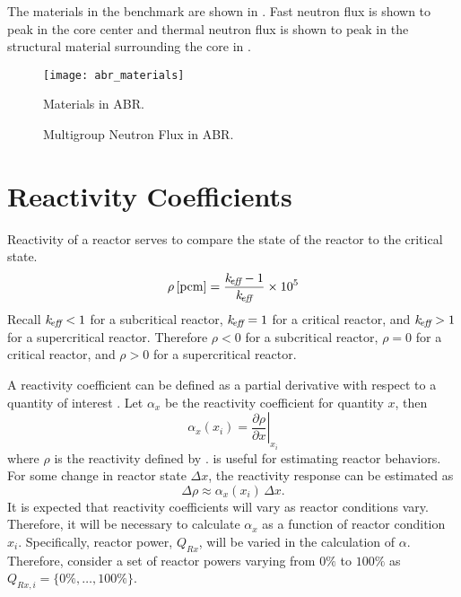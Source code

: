   The materials in the benchmark are shown in . Fast
  neutron flux is shown to peak in the core center and thermal neutron flux is
  shown to peak in the structural material surrounding the core in
  .

  \begin{figure}
    \centering
    \texttt{[image: abr\_materials]}
    \caption{Materials in ABR.}
    \label{fig:abr_materials}
  \end{figure}

  \begin{figure}
    \centering
    \hspace{0.2in}
    \caption{Multigroup Neutron Flux in ABR.}
    \label{fig:abr_fluxes}
  \end{figure}

\section{Reactivity Coefficients}
\label{sec:reactivity_coefficients}
  Reactivity of a reactor serves to compare the state of the reactor to the
  critical state.
  \begin{equation}
    \label{eq:reactivity}
    \rho \left[\text{{pcm}}\right] = \frac{k_{\!\mbox{\scriptsize \em eff}}-1}{k_{\!\mbox{\scriptsize \em eff}}} \times 10^5
  \end{equation}
  Recall $k_{\!\mbox{\scriptsize \em eff}} < 1$ for a subcritical reactor, $k_{\!\mbox{\scriptsize \em eff}}=1$ for a critical
  reactor, and $k_{\!\mbox{\scriptsize \em eff}} > 1$ for a supercritical reactor. Therefore $\rho < 0$
  for a subcritical reactor, $\rho = 0$ for a critical reactor, and $\rho > 0$
  for a supercritical reactor. 

  A reactivity coefficient can be defined as a partial derivative with respect
  to a quantity of interest \cite{textbookknief}. Let $\alpha_x$ be the 
  reactivity coefficient for quantity $x$, then
  \begin{equation}
    \label{eq:reactivity_coefficient}
    \alpha_x(x_i) = \left. \frac{\partial \rho}{\partial x} \right|_{x_i}
  \end{equation}
  where $\rho$ is the reactivity defined by .
   is useful for estimating reactor behaviors.
  For some change in reactor state $\Delta x$, the reactivity response can be
  estimated as 
  \begin{equation}
    \label{eq:reactivity_estimate}
    \Delta \rho \approx \alpha_x(x_i) \, \Delta x.
  \end{equation}
  It is expected that reactivity coefficients will vary as reactor conditions
  vary. Therefore, it will be necessary to calculate $\alpha_x$ as a function of
  reactor condition $x_i$. Specifically, reactor power, $Q_{Rx}$, will be varied 
  in the calculation of $\alpha$. Therefore, consider a set of reactor powers
  varying from $0\%$ to $100\%$ as $Q_{Rx,i} = \{0\%,\ldots,100\%\}$.

